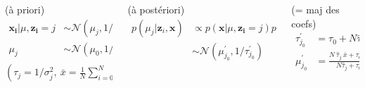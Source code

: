 \begin{frame}
\begin{itemize}
\begin{columns}[T]
            \begin{column}{0.3\textwidth}  %
                \centering
                {\small (à priori)} \\
                \vspace{0.1cm}
                $\begin{aligned}
                    \boldsymbol{x_i} | \mu,\boldsymbol{z_i} = j & \sim \mathcal{N}\left(\mu_{j}, 1 / \hat{\tau}_j \right) \\
                    \mu_j & \sim {\mathcal{N}}\left(\mu_{0}, 1 / \tau_{0}\right) \\
                \end{aligned}$ \\
                \vspace{0.2cm}
                {\tiny $\left(\tau_j = 1 / \sigma_j^2, \ \bar{x}=\frac{1}{N} \sum_{i=0}^{N}{x_i}\right)$}
            \end{column}
            \begin{column}{0.3\textwidth}
                \centering
                {\small (à postériori)} \\
                \vspace{0.2cm}
                $\begin{aligned}
                    p(\mu_j | \boldsymbol{z}_i, \mathbf{x}) & \propto p(\boldsymbol{x} | \mu,\boldsymbol{z_i} = j) p(\mu_j)  \\
                    & \sim {\mathcal{N}}( \mu_{j_0}^{\prime}, 1 / \tau^{\prime}_{j_0}) 
                \end{aligned}$
            \end{column}
            \begin{column}{0.4\textwidth}  %
                \centering
                {\small (= maj des coefs)} \\
                \vspace{0.1cm}
                $\begin{aligned}
                    \tau^{\prime}_{j_0} &= \tau_0 + N \hat{\tau}_j \\
                    \mu_{j_0}^{\prime} &= \frac{N\ \hat{\tau}_j\ \bar{x}+\tau_{0} \mu_{0}}{N \hat{\tau}_j+\tau_{0}} 
                \end{aligned}$
            \end{column}     
                    
        \end{columns}
\end{itemize}
    
\end{frame}

